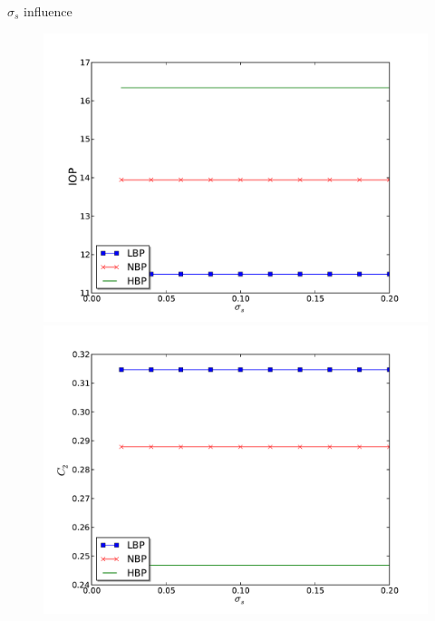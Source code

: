 \begin{frame}{$\sigma_s$ influence}
\begin{figure}[H]
\begin{minipage}{0.45\linewidth}
\includegraphics[scale=0.27]{images/IOP_sigmas}
\end{minipage}\hfill
\begin{minipage}{0.45\linewidth}
\includegraphics[scale=0.27]{images/C2_sigmas}
\end{minipage}
\end{figure}

\end{frame}
